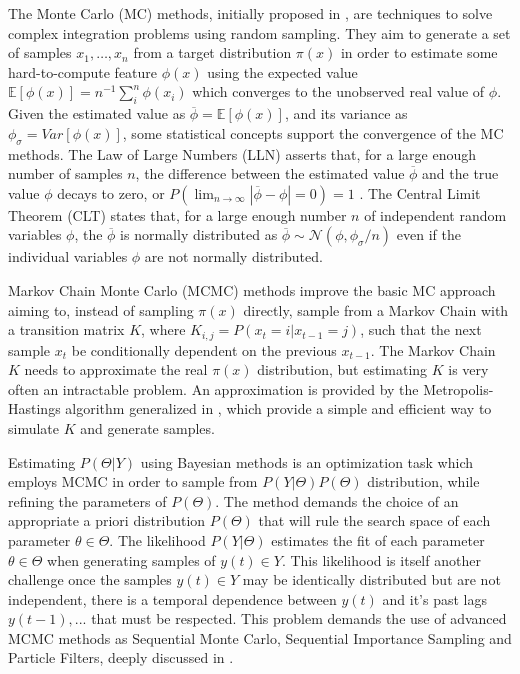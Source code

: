 The Monte Carlo (MC) methods, initially proposed in \cite{Metropolis1949}, are techniques to solve complex  integration problems using random sampling. They aim to generate a set of samples $x_1,\ldots,x_n$ from a target distribution $\pi(x)$ in order to estimate some hard-to-compute feature $\phi(x)$ using the expected value $\mathbb{E}[\phi(x)] = n^{-1}\sum_i^n \phi(x_i)$ which converges to the unobserved real value of $\phi$. Given the estimated value as $\overline{\phi} = \mathbb{E}[\phi(x)]$, and its variance as $\phi_\sigma = Var[\phi(x)]$, some statistical concepts support the convergence of the MC methods. The Law of Large Numbers (LLN) asserts that, for a large enough number of samples $n$, the difference between the estimated value $\overline{\phi}$ and the true value $\phi$ decays to zero, or $P(\lim_{n\to\infty} |\overline{\phi} - \phi| = 0) = 1$ . The Central Limit Theorem (CLT) states that, for a large enough number $n$ of independent random variables $\phi$, the $\overline{\phi}$ is normally distributed as $\overline{\phi} \sim \mathcal{N}(\phi,\phi_\sigma/n)$ even if the individual variables $\phi$ are not normally distributed.


Markov Chain Monte Carlo (MCMC) methods improve the basic MC approach aiming to, instead of sampling $\pi(x)$ directly, sample from a Markov Chain with a transition matrix $K$, where $K_{i,j} = P(x_t = i|x_{t-1} = j)$, such that the next sample $x_t$ be conditionally dependent on the previous $x_{t-1}$. The Markov Chain $K$ needs to approximate the real $\pi(x)$ distribution, but estimating $K$ is very often an intractable problem. An approximation is provided by the Metropolis-Hastings algorithm generalized in \cite{Hastings1970}, which provide a simple and efficient way to simulate $K$ and generate samples. 

Estimating $P(\Theta|Y)$ using Bayesian methods is an optimization task which employs MCMC in order to sample from $P(Y|\Theta)P(\Theta)$ distribution, while refining the parameters of $P(\Theta)$. The method demands the choice of an appropriate a priori distribution $P(\Theta)$ that will rule the search space of each parameter $\theta \in \Theta$. The likelihood $P(Y|\Theta)$ estimates the fit of each parameter $\theta \in \Theta$ when generating samples of $y(t)\in Y$. This likelihood is itself another challenge once the samples $y(t)\in Y$ may be identically distributed but are not independent, there is a temporal dependence between $y(t)$ and it's past lags $y(t-1),...$ that must be respected. This problem demands the use of advanced MCMC methods as Sequential Monte Carlo, Sequential Importance Sampling and Particle Filters, deeply discussed in \cite{Smith2013}.

